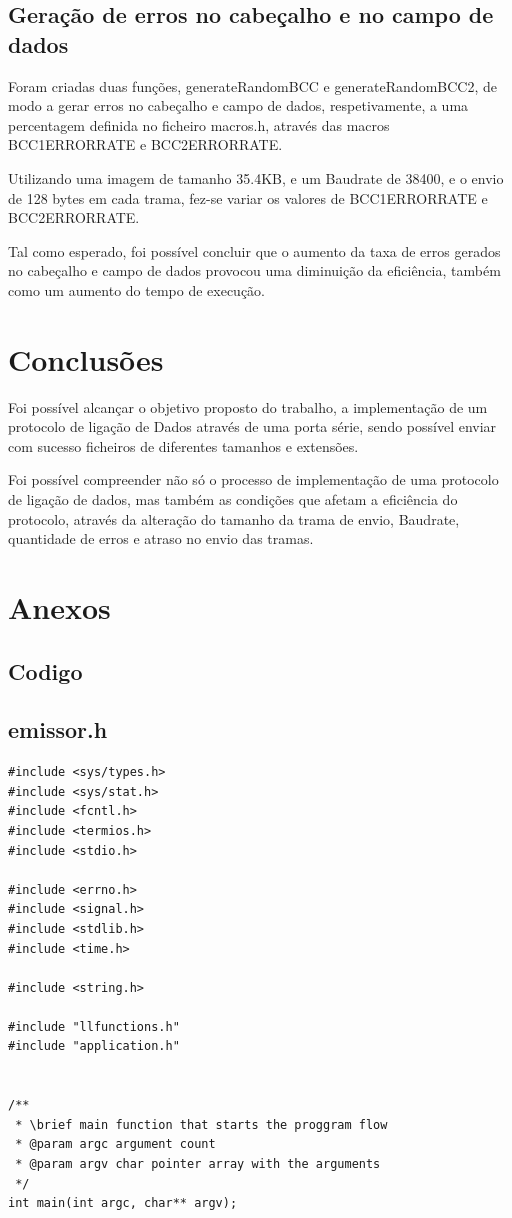 \documentclass{article}
\begin{document}
\subsection{Geração de erros no cabeçalho e no campo de dados}

Foram criadas duas funções, generateRandomBCC e generateRandomBCC2, de modo a gerar erros no cabeçalho e campo de dados, respetivamente, a uma percentagem definida no ficheiro macros.h, através das macros BCC1ERRORRATE e BCC2ERRORRATE.

Utilizando uma imagem de tamanho 35.4KB, e um Baudrate de 38400, e o envio de 128 bytes em cada trama, fez-se variar os valores de BCC1ERRORRATE e BCC2ERRORRATE.

Tal como esperado, foi possível concluir que o aumento da taxa de erros gerados no cabeçalho e campo de dados provocou uma diminuição da eficiência, também como um aumento do tempo de execução.

\section{Conclusões}
Foi possível alcançar o objetivo proposto do trabalho, a implementação de um protocolo de  ligação de Dados através de uma porta série, sendo possível enviar com sucesso ficheiros de diferentes tamanhos e extensões.

Foi possível compreender não só o processo de implementação de uma protocolo de ligação de dados, mas também as condições que afetam a eficiência do protocolo, através da alteração do tamanho da trama de envio, Baudrate, quantidade de erros e atraso no envio das tramas.





\section{Anexos}

\subsection{Codigo}

\subsection{emissor.h}
\begin{lstlisting}[style=CStyle]
#include <sys/types.h>
#include <sys/stat.h>
#include <fcntl.h>
#include <termios.h>
#include <stdio.h>

#include <errno.h>
#include <signal.h>
#include <stdlib.h>
#include <time.h>

#include <string.h>

#include "llfunctions.h"
#include "application.h"


/**
 * \brief main function that starts the proggram flow
 * @param argc argument count
 * @param argv char pointer array with the arguments
 */
int main(int argc, char** argv);

\end{lstlisting}
\end{document}
